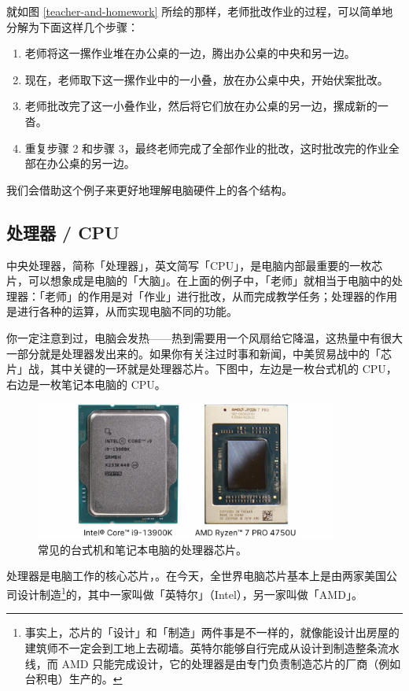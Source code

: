 就如图 \ref{teacher-and-homework} 所绘的那样，老师批改作业的过程，可以简单地分解为下面这样几个步骤：

\begin{enumerate}
  \item 老师将这一摞作业堆在办公桌的一边，腾出办公桌的中央和另一边。
  \item 现在，老师取下这一摞作业中的一小叠，放在办公桌中央，开始伏案批改。
  \item 老师批改完了这一小叠作业，然后将它们放在办公桌的另一边，摞成新的一沓。
  \item 重复步骤 2 和步骤 3，最终老师完成了全部作业的批改，这时批改完的作业全部在办公桌的另一边。
\end{enumerate}

我们会借助这个例子来更好地理解电脑硬件上的各个结构。

\subsection{处理器 / CPU}

中央处理器，简称「处理器」，英文简写「CPU」，是电脑内部最重要的一枚芯片，可以想象成是电脑的「大脑」。在上面的例子中，「老师」就相当于电脑中的处理器：「老师」的作用是对「作业」进行批改，从而完成教学任务；处理器的作用是进行各种的运算，从而实现电脑不同的功能。

你一定注意到过，电脑会发热——热到需要用一个风扇给它降温，这热量中有很大一部分就是处理器发出来的。如果你有关注过时事和新闻，中美贸易战中的「芯片」战，其中关键的一环就是处理器芯片。下图中，左边是一枚台式机的 CPU，右边是一枚笔记本电脑的 CPU。

\begin{figure}[H]
  \centering
  \includegraphics[width=10cm]{assets/CPUs.jpg}
  \caption{常见的台式机和笔记本电脑的处理器芯片。}
  \label{cpus}
\end{figure}

处理器是电脑工作的核心芯片，。在今天，全世界电脑芯片基本上是由两家美国公司设计制造\footnote{事实上，芯片的「设计」和「制造」两件事是不一样的，就像能设计出房屋的建筑师不一定会到工地上去砌墙。英特尔能够自行完成从设计到制造整条流水线，而 AMD 只能完成设计，它的处理器是由专门负责制造芯片的厂商（例如台积电）生产的。}的，其中一家叫做「英特尔」（Intel），另一家叫做「AMD」。

